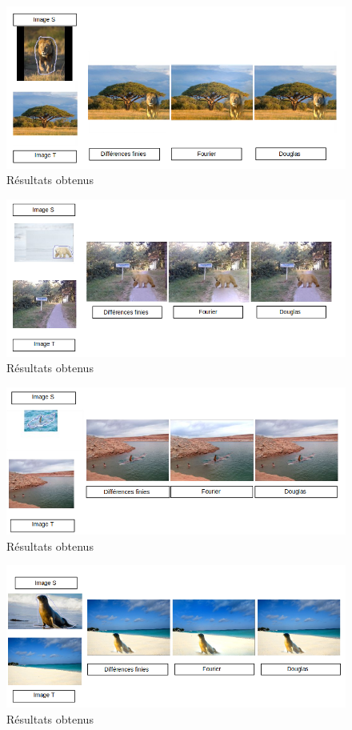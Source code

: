 \begin{figure}[!htb]
\centering
\includegraphics[scale=0.6]{Images/Resultats/3.png}
\caption{Résultats obtenus}
\end{figure}

\begin{figure}[!htb]
\centering
\includegraphics[scale=0.6]{Images/Resultats/4.png}
\caption{Résultats obtenus}
\end{figure}

\begin{figure}[!htb]
\centering
\includegraphics[scale=0.6]{Images/Resultats/5.png}
\caption{Résultats obtenus}
\end{figure}

\begin{figure}[!htb]
\centering
\includegraphics[scale=0.6]{Images/Resultats/6.png}
\caption{Résultats obtenus}
\end{figure}

